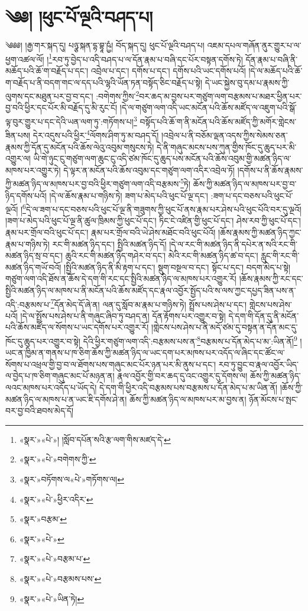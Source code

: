 \chapter{༄༅། །ཕུང་པོ་ལྔའི་བཤད་པ།}༄༅༅། །རྒྱ་གར་སྐད་དུ། པཉྩ་སྐན་དྷ་བྷཱ་ཥྱཾ། བོད་སྐད་དུ། ཕུང་པོ་ལྔའི་བཤད་པ། འཇམ་དཔལ་གཞོན་ནུར་གྱུར་པ་ལ་ཕྱག་འཚལ་ལོ། །\footnote{«སྣར་»«པེ་»། །སློབ་དཔོན་སའི་རྩ་ལག་གིས་མཛད་དེ་}རབ་ཏུ་བྱེད་པ་འདི་བཤད་པ་ལ་དོན་རྣམ་པ་བཞི་དང་པོར་བསྟན་དགོས་ཏེ། དོན་རྣམ་པ་བཞི་ནི་མཆོད་པའི་ཆོ་ག་བརྗོད་པ་དང་། འབྲེལ་པ་དང་། དགོས་པ་དང་། དགོས་པའི་ཡང་དགོས་པའོ། །དེ་ལ་མཆོད་པའི་ཆོ་ག་བརྗོད་པ་ནི་བདག་གང་ལ་དད་པའི་ལྷའི་ཡོན་ཏན་བསྟོད་ཅིང་བརྗོད་པ་སྟེ། དེ་ཡང་སྐྱེས་བུ་དམ་པ་རྣམས་ཀྱི་ལུགས་དང་མཐུན་པར་བྱ་བ་དང་། :བགེགས་ཀྱིས་\footnote{«སྣར་»«པེ་»བགེགས་ཀྱི་}བར་ཆད་མ་བྱས་པར་གཙུག་ལག་བརྩམས་པ་མཐར་ཕྱིན་པར་བྱ་བའི་ཕྱིར་དང་པོར་མི་བརྗོད་དུ་མི་རུང་ངོ། །དེ་ལ་གཙུག་ལག་འདི་ཡང་མངོན་པའི་ཆོས་མཛོད་ལ་འཇུག་པའི་སྒོ་ལྟ་བུར་གྱུར་པ་དང་དེའི་ཡན་ལག་ཏུ་:གཏོགས་པ།\footnote{«སྣར་»བཏོགས་ལ«པེ་»གཏོགས་ལ།} བསྟོད་པའི་ཆོ་ག་ནི་མངོན་པའི་ཆོས་མཛོད་ཀྱི་མགོར་གླེངས་ཟིན་པས། དེར་འདུས་པའི་ཕྱིར་\footnote{«སྣར་»«པེ་»ཕྱིར་འདིར་}ལོགས་ཤིག་ཏུ་མ་བཤད་དོ། །འབྲེལ་པ་ནི་བཅོམ་ལྡན་འདས་ཀྱིས་སེམས་ཅན་རྣམས་ཀྱི་དོན་དུ་མངོན་པའི་ཆོས་ལེའུ་འབུམ་གསུངས་ཏེ། དེ་ནི་གཞུང་མངས་པས་ཀུན་གྱིས་ཁོང་དུ་ཆུད་པར་མི་འགྱུར་ལ། ཡི་གེ་ཉུང་ངུ་གཙུག་ལག་ཆུང་ངུ་འདི་ཙམ་ཁོང་དུ་ཆུད་པས་མངོན་པའི་ཆོས་འབུམ་གྱི་མཚན་ཉིད་ལ་མཁས་པར་འགྱུར་ཏེ། དེ་ལྟར་ན་མངོན་པའི་ཆོས་འབུམ་དང་གཙུག་ལག་འདིར་འབྲེལ་ཏོ། །དགོས་པ་ནི་ཆོས་རྣམས་ཀྱི་མཚན་ཉིད་ལ་མཁས་པར་བྱ་བའི་ཕྱིར་གཙུག་ལག་འདི་བརྩམས་\footnote{«སྣར་»བརྩམ་}ཏེ། ཆོས་ཀྱི་མཚན་ཉིད་ལ་མཁས་པར་བྱ་བ་ཉིད་དགོས་པའོ། །དེ་ལ་ཆོས་རྣམ་པ་གཉིས་ཏེ། ཟག་པ་མེད་པའི་ཕུང་པོ་ལྔ་དང་། :ཟག་པ་དང་བཅས་པའི་ཕུང་པོ་ལྔའོ། །\footnote{«སྣར་»«པེ་»}དེ་ལ་ཟག་པ་དང་བཅས་པའི་ཕུང་པོ་ལྔ་ནི་གཟུགས་ཀྱི་ཕུང་པོ་ནས་རྣམ་པར་ཤེས་པའི་ཕུང་པོའི་བར་དུ་ལྔའོ། །ཟག་པ་མེད་པའི་ཕུང་པོ་ལྔ་ནི་ཚུལ་ཁྲིམས་ཀྱི་ཕུང་པོ་དང་། ཏིང་ངེ་འཛིན་གྱི་ཕུང་པོ་དང་། ཤེས་རབ་ཀྱི་ཕུང་པོ་དང་། རྣམ་པར་གྲོལ་བའི་ཕུང་པོ་དང་། རྣམ་པར་གྲོལ་བའི་ཡེ་ཤེས་མཐོང་བའི་ཕུང་པོའོ། །ཆོས་རྣམས་ཀྱི་མཚན་ཉིད་ཀྱང་རྣམ་པ་གཉིས་ཏེ། རང་གི་མཚན་ཉིད་དང་། སྤྱིའི་མཚན་ཉིད་དོ། །དེ་ལ་རང་གི་མཚན་ཉིད་ནི་དཔེར་ན་སའི་རང་གི་མཚན་ཉིད་སྲ་བ་དང་། ཆུའི་རང་གི་མཚན་ཉིད་གཤེར་བ་དང་། མེའི་རང་གི་མཚན་ཉིད་ཚ་བ་དང་། རླུང་གི་རང་གི་མཚན་ཉིད་གཡོ་བའོ། །སྤྱིའི་མཚན་ཉིད་ནི་མི་རྟག་པ་དང་། སྡུག་བསྔལ་བ་དང་། སྟོང་པ་དང་། བདག་མེད་པ་སྟེ། གཙུག་ལག་འདི་ཐོས་ན་ཆོས་དེ་དག་གི་རང་དང་སྤྱིའི་མཚན་ཉིད་ལ་མཁས་པར་འགྱུར་རོ། །ཆོས་རྣམས་ཀྱི་རང་དང་སྤྱིའི་མཚན་ཉིད་ལ་མཁས་པ་ནི་མངོན་པའི་ཆོས་མཛོད་དང་རྣལ་འབྱོར་སྤྱོད་པའི་ས་ལས་ཀྱང་དཔྱད་ཟིན་པས་ན་འདི་:བརྩམས་པ་\footnote{«སྣར་»«པེ་»བརྩམ་པ་}དོན་མེད་དོ་ཞེ་ན། ལན་དུ་སློབ་མ་རྣམ་པ་གཉིས་ཏེ། སྤྲོས་པས་ཤེས་པ་དང་། གླེངས་པས་ཤེས་པའོ། །དེ་ལ་སྤྲོས་པས་ཤེས་པ་ནི་གཞུང་ཞིབ་ཏུ་བཤད་ན། དོན་རྟོགས་པར་འགྱུར་བ་སྟེ། དེ་དག་གི་དོན་དུ་ནི་མངོན་པའི་ཆོས་མཛོད་ལ་སོགས་པ་ཡང་དགོས་པར་འགྱུར་རོ། །གླེངས་པས་ཤེས་པ་ནི་མདོ་ཙམ་དུ་བསྟན་ན་དོན་མང་དུ་ཁོང་དུ་ཆུད་པར་འགྱུར་བ་སྟེ། དེའི་ཕྱིར་གཙུག་ལག་འདི་:བརྩམས་པས་ན་\footnote{«སྣར་»«པེ་»བརྩམས་པས་}བརྩམས་པ་དོན་མེད་པ་མ་:ཡིན་ནོ།\footnote{«སྣར་»«པེ་»ཡིན་ཏེ།} །ཡང་ན་ཁྱིམ་ན་གནས་པ་ཁ་ཅིག་ཆོས་ཀྱི་མཚན་ཉིད་ལ་ཡང་དག་པར་མཁས་པར་འདོད་ལ་ཞིང་དང་ཚོང་ལ་སོགས་པ་འཕྲལ་གྱི་བྱ་བ་ལ་ཐོགས་པས་གཞུང་མང་པོར་ཉན་པར་མི་ནུས་པ་དང་། རབ་ཏུ་བྱུང་བ་རྣལ་འབྱོར་ཡིད་ལ་བྱེད་པ་ཁ་ཅིག་གཞུང་མང་པོ་མཉན་ན། རྣལ་འབྱོར་གྱི་བར་ཆད་དུ་འང་འགྱུར་དུ་དོགས་ལ། ཆོས་ཀྱི་མཚན་ཉིད་ལའང་མཁས་པར་འདོད་པ་ཡོད་དེ། དེ་དག་གི་ཕྱིར་འདི་བརྩམས་པས་བརྩམས་པ་དོན་མེད་པ་མ་ཡིན་ནོ། །ཆོས་ཀྱི་མཚན་ཉིད་ལ་མཁས་པ་ན་ཡང་ཇི་དགོས་ཤེ་ན། ཆོས་ཀྱི་མཚན་ཉིད་ལ་མཁས་པར་མ་བྱས་ན། ཉོན་མོངས་པ་སྤང་བར་བྱ་བའི་ཐབས་མེད་དོ། 